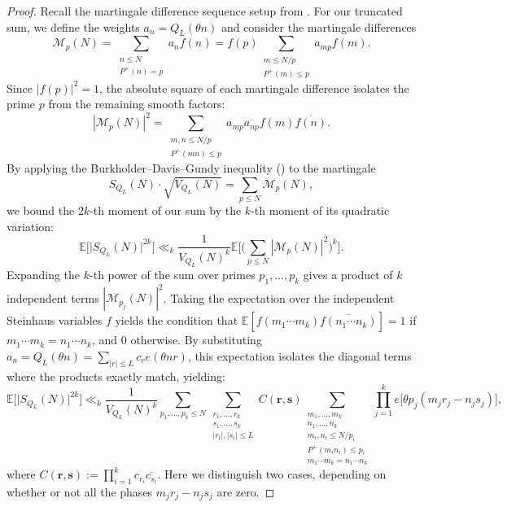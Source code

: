 \documentclass[12pt]{amsart}
\renewcommand{\le}{\leqslant}
\renewcommand{\leq}{\leqslant}
\numberwithin{equation}{section}
\theoremstyle{plain}
\theoremstyle{definition}
\newcommand{\E}{\mathbb{E}}
\newcommand{\CM}{\mathcal{M}}
\begin{document}
	\begin{proof}
		Recall the martingale difference sequence setup from . For our truncated sum, we define the weights $a_n = Q_L(\theta n)$ and consider the martingale differences
		$$\CM_p(N) = \sum_{\substack{n \leq N \\ P^+(n) = p}} a_n f(n) = f(p) \sum_{\substack{m \leq N/p \\ P^+(m) \leq p}} a_{mp} f(m).$$
		Since $|f(p)|^2 = 1$, the absolute square of each martingale difference isolates the prime $p$ from the remaining smooth factors:
		$$|\CM_p(N)|^2 = \sum_{\substack{m,n \leq N/p \\ P^+(mn) \leq p}} a_{mp} \overline{a_{np}} f(m) \overline{f(n)}.$$
		By applying the Burkholder--Davis--Gundy inequality () to the martingale $$S_{Q_L}(N)\cdot\sqrt{V_{Q_L}(N)} = \sum_{p \leq N} \CM_p(N),$$ we bound the $2k$-th moment of our sum by the $k$-th moment of its quadratic variation:
		\begin{equation*}
			\E\Big[\big|S_{Q_L}(N)\big|^{2k}\Big] \ll_k \frac{1}{V_{Q_L}(N)^k} \E\bigg[ \bigg( \sum_{p \leq N} |\CM_p(N)|^2 \bigg)^k \bigg].
		\end{equation*}
		Expanding the $k$-th power of the sum over primes $p_1, \dots, p_k$ gives a product of $k$ independent terms $|\CM_{p_j}(N)|^2$. Taking the expectation over the independent Steinhaus variables $f$ yields the condition that $\E[f(m_1\cdots m_k)\overline{f(n_1\cdots n_k)}] = 1$ if $m_1\cdots m_k = n_1\cdots n_k$, and $0$ otherwise. By substituting $a_n = Q_L(\theta n) = \sum_{|r| \le L} c_r e(\theta n r)$, this expectation isolates the diagonal terms where the products exactly match, yielding:
		\begin{equation}\label{eq: BDG 1}
			\E\Big[\big|S_{Q_L}(N)\big|^{2k}\Big] \ll_k  \frac{1}{V_{Q_L}(N)^k}\sum_{p_1,\dots,p_k \leq N}\sum_{\substack{r_1,\dots ,r_k \\ s_1,\dots ,s_k \\ |r_i|,|s_i| \leq L}}C(\bm{r,s})\sum_{\substack{m_1,\dots, m_k\\ n_1,\dots ,n_k\\ m_i,n_i \leq N/p_i\\ P^+(m_in_i) \leq p_i\\ m_1\cdots m_k=n_1 \cdots n_k}} \prod_{j=1}^k e\big[\theta p_j(m_jr_j-n_js_j)\big],
		\end{equation}
		where $C(\bm{r,s}) := \prod_{i = 1}^k c_{r_i}\overline{c_{s_i}}.$
		Here we distinguish two cases, depending on whether or not all the phases $m_jr_j-n_js_j$ are zero. 
		

\end{proof}
\end{document}
